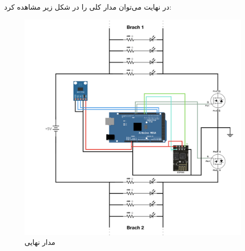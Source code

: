 \documentclass[12pt,a4paper]{article}
\begin{document}
	در نهایت می‌توان مدار کلی را در شکل زیر مشاهده کرد:
		 \begin{figure}[H]
		\centering
		\includegraphics[scale=0.1]{figs/finalcircuit001.jpeg}
		\caption{
			مدار نهایی
		}
		\label{fig:schema1}
	\end{figure}
		\newpage
\end{document}
